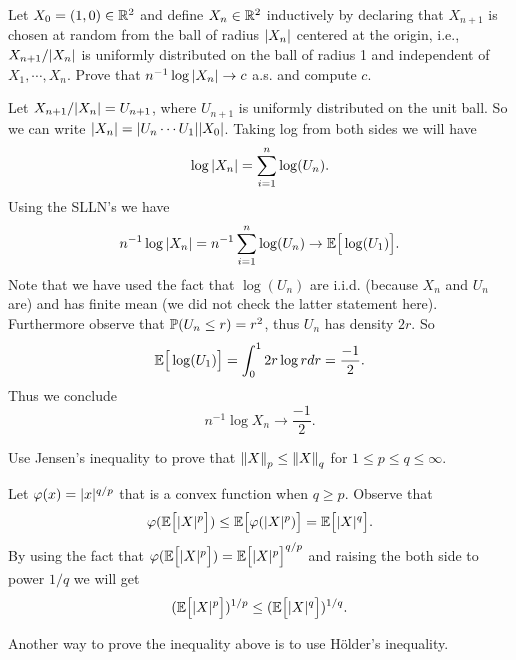 \begin{problem}
	Let $ X_0 = (1,0) \in \mathbb{R}^2 $ and define $ X_n \in \mathbb{R}^2 $ inductively by declaring that $ X_{n+1} $ is chosen at random from the ball of radius $ |X_n| $ centered at the origin, i.e., $ X_{n+1}/|X_n| $ is uniformly distributed on the ball of radius 1 and independent of $ X_1,\cdots, X_n $. Prove that $ n^{-1}\log|X_n| \to c $ a.s. and compute $ c $.
\end{problem}
\begin{solution}
	Let $ X_{n+1}/|X_n| = U_{n+1} $, where $ U_{n+1} $ is uniformly distributed on the unit ball. So we can write $ |X_n| = |U_n \cdots U_1||X_0| $. Taking log from both sides we will have
	\[ \log|X_n| = \sum_{i=1}^{n}\log(U_n). \]
	Using the SLLN's we have 
	\[ n^{-1} \log|X_n| = n^{-1}\sum_{i=1}^{n}\log(U_n) \to \mathbb{E}\big[\log(U_1)\big]. \]
	Note that we have used the fact that $ \log(U_n) $ are i.i.d. (because $ X_n $ and $ U_n $ are) and has finite mean (we did not check the latter statement here). Furthermore observe that $ \mathbb{P}(U_n \leq r) = r^2 $, thus $ U_n $ has density $ 2r $. So
	\[ \mathbb{E}\big[\log(U_1)\big] = \int_{0}^{1} 2r\log r dr = \frac{-1}{2}. \]
	Thus we conclude
	\[ n^{-1}\log{X_n} \to \frac{-1}{2}. \]
\end{solution}

\begin{problem}
	Use Jensen's inequality to prove that $ \norm{X}_p \leq \norm{X}_q $ for $ 1\leq p \leq q \leq \infty $.
\end{problem}
\begin{solution}
	Let $ \varphi(x) = |x|^{q/p} $ that is a convex function when $ q\geq p $. Observe that
	\[ \varphi(\mathbb{E}\big[|X|^p\big]) \leq \mathbb{E}\big[\varphi(|X|^p)\big] = \mathbb{E}\big[|X|^q\big]. \] 
	By using the fact that $ \varphi(\mathbb{E}\big[|X|^p\big]) = \mathbb{E}\big[|X|^p\big]^{q/p} $ and raising the both side to power $ 1/q $ we will get
	\[ (\mathbb{E}\big[|X|^p\big])^{1/p} \leq (\mathbb{E}\big[|X|^q\big])^{1/q}. \]
\end{solution}
\begin{remark}
	Another way to prove the inequality above is to use H\"{o}lder's inequality.
\end{remark}

